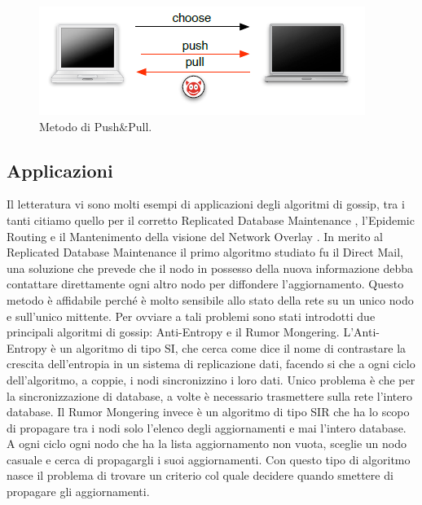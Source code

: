 \begin{figure}[h]
	\centering
	\includegraphics[width=0.6\linewidth,keepaspectratio]{Images/algoritmi_gossip/push_pull}
	\caption[Metodo di Push\&Pull]{Metodo di Push\&Pull.}
	\label{fig:push_pull}
\end{figure}

\subsection{Applicazioni}
Il letteratura vi sono molti esempi di applicazioni degli algoritmi di gossip, tra i tanti citiamo quello per il corretto Replicated Database Maintenance \cite{montresor2004-antiEntropy}, l'Epidemic Routing e il Mantenimento della visione del Network Overlay \cite{montresor2004-overlay}. In merito al Replicated Database Maintenance il primo algoritmo studiato fu il Direct Mail, una soluzione che prevede che il nodo in possesso della nuova informazione debba contattare direttamente ogni altro nodo per diffondere l'aggiornamento. Questo metodo è affidabile perché è molto sensibile allo stato della rete su un unico nodo e sull'unico mittente. Per ovviare a tali problemi sono stati introdotti due principali algoritmi di gossip: Anti-Entropy e il Rumor Mongering. L'Anti-Entropy è un algoritmo di tipo SI, che cerca come dice il nome di contrastare la crescita dell'entropia in un sistema di replicazione dati, facendo si che a ogni ciclo dell'algoritmo, a coppie, i nodi sincronizzino i loro dati. Unico problema è che per la sincronizzazione di database, a volte è necessario trasmettere sulla rete l'intero database. Il Rumor Mongering invece è un algoritmo di tipo SIR che ha lo scopo di propagare tra i nodi solo l'elenco degli aggiornamenti e mai l'intero database. A ogni ciclo ogni nodo che ha la lista aggiornamento non vuota, sceglie un nodo casuale e cerca di propagargli i suoi aggiornamenti. Con questo tipo di algoritmo nasce il problema di trovare un criterio col quale decidere quando smettere di propagare gli aggiornamenti.
 
